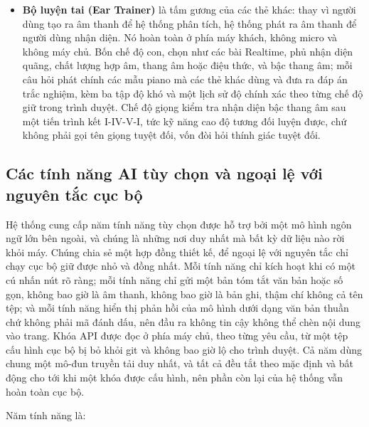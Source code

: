 \documentclass[12pt,a4paper]{article}
\begin{document}
\begin{itemize}
    thanh rồi chấm cao độ đã hát so với nốt đang hoạt động. Dung sai đúng cao độ có
    thể chọn (bốn mức độ khó), âm lượng hướng dẫn điều chỉnh được, và lượt hát có thể
    tạm dừng và tiếp tục.
    \item \textbf{Bộ luyện tai (Ear Trainer)} là tấm gương của các thẻ khác: thay vì
    người dùng tạo ra âm thanh để hệ thống phân tích, hệ thống phát ra âm thanh để
    người dùng nhận diện. Nó hoàn toàn ở phía máy khách, không micro và không máy
    chủ. Bốn chế độ con, chọn như các bài Realtime, phủ nhận diện quãng, chất lượng
    hợp âm, thang âm hoặc điệu thức, và bậc thang âm; mỗi câu hỏi phát chính các mẫu
    piano mà các thẻ khác dùng và đưa ra đáp án trắc nghiệm, kèm ba tập độ khó và một
    lịch sử độ chính xác theo từng chế độ giữ trong trình duyệt. Chế độ giọng kiểm
    tra nhận diện bậc thang âm sau một tiến trình kết I-IV-V-I, tức kỹ năng cao độ
    tương đối luyện được, chứ không phải gọi tên giọng tuyệt đối, vốn đòi hỏi thính
    giác tuyệt đối.
\end{itemize}

\subsection{Các tính năng AI tùy chọn và ngoại lệ với nguyên tắc cục bộ}
\label{sec:coaching}

Hệ thống cung cấp năm tính năng tùy chọn được hỗ trợ bởi một mô hình ngôn ngữ lớn
bên ngoài, và chúng là những nơi duy nhất mà bất kỳ dữ liệu nào rời khỏi máy. Chúng
chia sẻ một hợp đồng thiết kế, để ngoại lệ với nguyên tắc chỉ chạy cục bộ giữ được
nhỏ và đồng nhất. Mỗi tính năng chỉ kích hoạt khi có một cú nhấn nút rõ ràng; mỗi
tính năng chỉ gửi một bản tóm tắt văn bản hoặc số gọn, không bao giờ là âm thanh,
không bao giờ là bản ghi, thậm chí không cả tên tệp; và mỗi tính năng hiển thị phản
hồi của mô hình dưới dạng văn bản thuần chứ không phải mã đánh dấu, nên đầu ra không
tin cậy không thể chèn nội dung vào trang. Khóa API được đọc ở phía máy chủ, theo
từng yêu cầu, từ một tệp cấu hình cục bộ bị bỏ khỏi git và không bao giờ lộ cho
trình duyệt. Cả năm dùng chung một mô-đun truyền tải duy nhất, và tất cả đều tắt
theo mặc định và bất động cho tới khi một khóa được cấu hình, nên phần còn lại của
hệ thống vẫn hoàn toàn cục bộ.

Năm tính năng là:
\end{document}
